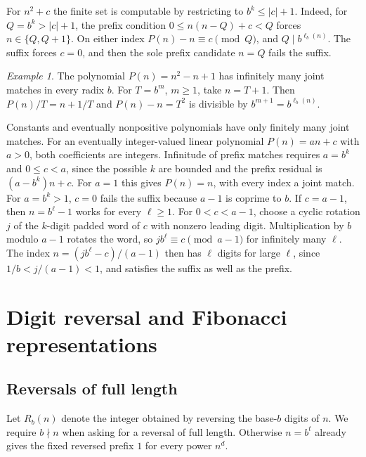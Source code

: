 \documentclass[11pt,reqno,a4paper]{amsart}
\theoremstyle{remark}
\newtheorem{example}[theorem]{Example}
\begin{document}
For \(n^2+c\) the finite set is computable by restricting
to \(b^k\le |c|+1\). Indeed, for \(Q=b^k>|c|+1\), the
prefix condition \(0\le n(n-Q)+c<Q\) forces
\(n\in\{Q,Q+1\}\). On either index \(P(n)-n\equiv c\pmod Q\),
and \(Q\mid b^{\ell_b(n)}\). The suffix forces \(c=0\), and
then the sole prefix candidate \(n=Q\) fails the suffix.

\begin{example}\label{ex:pol-joint-quadratic}
The polynomial \(P(n)=n^2-n+1\) has infinitely many joint
matches in every radix \(b\). For \(T=b^m\), \(m\ge1\),
take \(n=T+1\). Then \(P(n)/T=n+1/T\) and \(P(n)-n=T^2\)
is divisible by \(b^{m+1}=b^{\ell_b(n)}\).
\end{example}

Constants and eventually nonpositive polynomials have only
finitely many joint matches. For an eventually integer-valued
linear polynomial \(P(n)=an+c\) with \(a>0\), both coefficients
are integers. Infinitude of prefix matches requires \(a=b^k\)
and \(0\le c<a\), since the possible \(k\) are bounded and
the prefix residual is \((a-b^k)n+c\). For \(a=1\) this
gives \(P(n)=n\), with every index a joint match. For
\(a=b^k>1\), \(c=0\) fails the suffix because \(a-1\) is
coprime to \(b\). If \(c=a-1\), then \(n=b^\ell-1\) works
for every \(\ell\ge1\). For \(0<c<a-1\), choose a cyclic
rotation \(j\) of the \(k\)-digit padded word of \(c\) with
nonzero leading digit. Multiplication by \(b\) modulo \(a-1\)
rotates the word, so \(jb^\ell\equiv c\pmod{a-1}\) for
infinitely many \(\ell\). The index
\(n=(jb^\ell-c)/(a-1)\) then has \(\ell\) digits for large
\(\ell\), since \(1/b<j/(a-1)<1\), and satisfies the suffix
as well as the prefix.

\section{Digit reversal and Fibonacci representations}\label{sec:representations}

\subsection{Reversals of full length}
Let \(R_b(n)\) denote the integer obtained by reversing the base-\(b\)
digits of \(n\). We require \(b\nmid n\) when asking for a reversal
of full length. Otherwise \(n=b^t\) already gives the fixed reversed
prefix \(1\) for every power \(n^d\).
\end{document}
